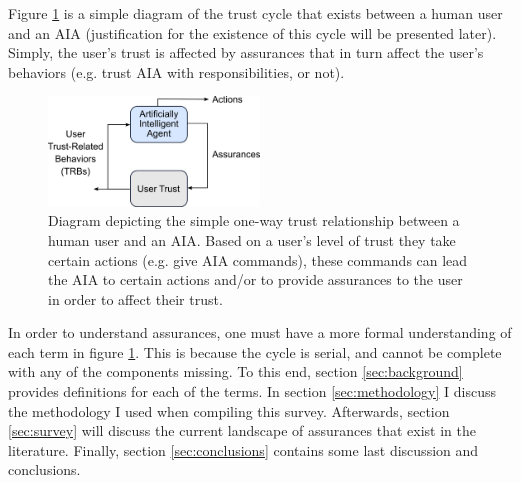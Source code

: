     Figure \ref{fig:SimpleTrust_one_way} is a simple diagram of the trust cycle that exists between a human user and an AIA (justification for the existence of this cycle will be presented later). Simply, the user's trust is affected by assurances that in turn affect the user's behaviors (e.g. trust AIA with responsibilities, or not).

    \begin{figure}
        \centering
        \includegraphics[width=0.5\textwidth]{Figures/SimpleTrust_one_way.png}
        \caption{Diagram depicting the simple one-way trust relationship between a human user and an AIA. Based on a user's level of trust they take certain actions (e.g. give AIA commands), these commands can lead the AIA to certain actions and/or to provide assurances to the user in order to affect their trust.}
        \label{fig:SimpleTrust_one_way}
    \end{figure}

    In order to understand assurances, one must have a more formal understanding of each term in figure \ref{fig:SimpleTrust_one_way}. This is because the cycle is serial, and cannot be complete with any of the components missing. To this end, section \ref{sec:background} provides definitions for each of the terms. In section \ref{sec:methodology} I discuss the methodology I used when compiling this survey. Afterwards, section \ref{sec:survey} will discuss the current landscape of assurances that exist in the literature. Finally, section \ref{sec:conclusions} contains some last discussion and conclusions.
